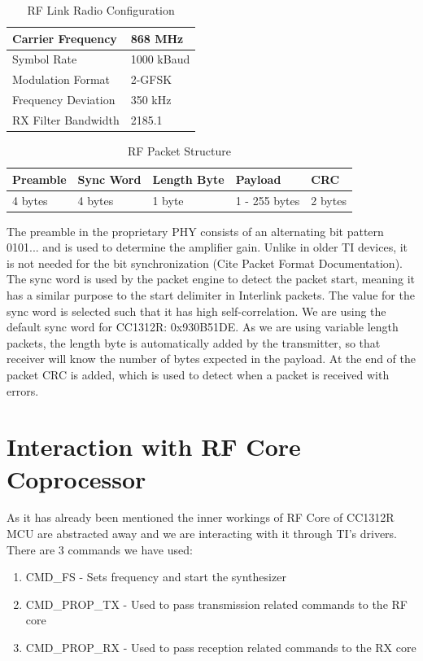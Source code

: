 \newpage

\begin{table}
\centering
\caption{RF Link Radio Configuration}
\label{rf-link-config}
\begin{tabular}{|l|l|}
\hline 
Carrier Frequency & 868 MHz \tabularnewline \hline 
Symbol Rate & 1000 kBaud \tabularnewline \hline
Modulation Format & 2-GFSK \tabularnewline \hline
Frequency Deviation & 350 kHz \tabularnewline \hline
RX Filter Bandwidth & 2185.1 \tabularnewline \hline
\end{tabular}
\end{table}

\begin{table}
\centering
\caption{RF Packet Structure}
\label{rf-pkt-struct}
\begin{tabular}{|l|l|l|l|l|}
\hline 
Preamble & Sync Word & Length Byte & Payload & CRC \tabularnewline \hline
4 bytes & 4 bytes & 1 byte & 1 - 255 bytes & 2 bytes \tabularnewline \hline
\end{tabular}
\end{table}

The preamble in the proprietary PHY consists of an alternating bit pattern 0101... and is used to determine the amplifier gain. Unlike in older TI devices, it is not needed for the bit synchronization (Cite Packet Format Documentation). 
The sync word is used by the packet engine to detect the packet start, meaning it has a similar purpose to the start delimiter in Interlink packets. The value for the sync word is selected such that it has high self-correlation. We are using the default sync word for CC1312R: 0x930B51DE.
As we are using variable length packets, the length byte is automatically added by the transmitter, so that receiver will know the number of bytes expected in the payload.
At the end of the packet CRC is added, which is used to detect when a packet is received with errors.

\section{Interaction with RF Core Coprocessor}

As it has already been mentioned the inner workings of RF Core of CC1312R MCU are abstracted away and we are interacting with it through TI’s drivers. There are 3 commands we have used:
\begin{enumerate}[nolistsep]
\item CMD\_FS - Sets frequency and start the synthesizer 
\item CMD\_PROP\_TX - Used to pass transmission related commands to the RF core 
\item CMD\_PROP\_RX - Used to pass reception related commands to the RX core 
\end{enumerate}

